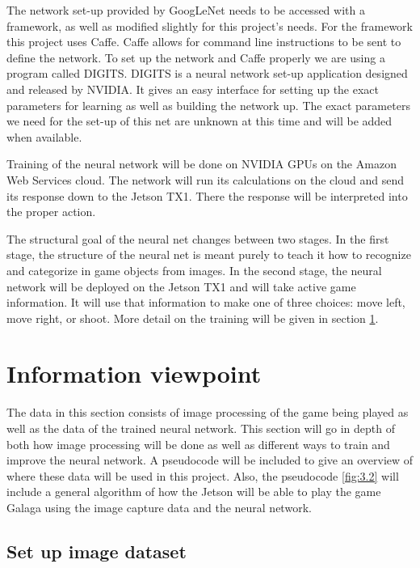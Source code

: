 \documentclass{scrreprt}
\begin{document}
The network set-up provided by GoogLeNet needs to be accessed with a framework, as well as modified slightly for this project's needs.
For the framework this project uses Caffe.
Caffe allows for command line instructions to be sent to define the network.
To set up the network and Caffe properly we are using a program called DIGITS.
DIGITS is a neural network set-up application designed and released by NVIDIA.
It gives an easy interface for setting up the exact parameters for learning as well as building the network up.
The exact parameters we need for the set-up of this net are unknown at this time and will be added when available.
\newline

Training of the neural network will be done on NVIDIA GPUs on the Amazon Web Services cloud.
The network will run its calculations on the cloud and send its response down to the Jetson TX1.
There the response will be interpreted into the proper action.
\newline

The structural goal of the neural net changes between two stages.
In the first stage, the structure of the neural net is meant purely to teach it how to recognize and categorize in game objects from images.
In the second stage, the neural network will be deployed on the Jetson TX1 and will take active game information.
It will use that information to make one of three choices: move left, move right, or shoot.
More detail on the training will be given in section \ref{sssec:num2}.

\section{Information viewpoint}\label{sssec:num2}%

The data in this section consists of image processing of the game being played as well as the data of the trained neural network.
This section will go in depth of both how image processing will be done as well as different ways to train and improve the neural network.
A pseudocode will be included to give an overview of where these data will be used in this project.
Also, the pseudocode \ref{fig:3.2} will include a general algorithm of how the Jetson will be able to play the game Galaga using the image capture data and the neural network.

\subsection{Set up image dataset}%
\end{document}
